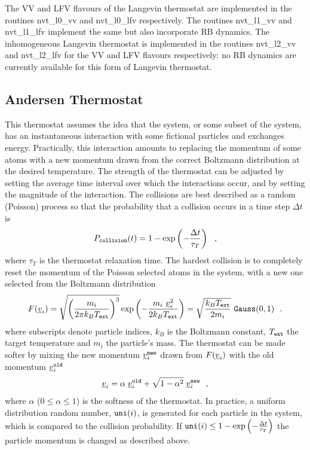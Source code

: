 The VV and LFV flavours of the Langevin thermostat are implemented in
the \D routines {\sc nvt\_l0\_vv} and {\sc nvt\_l0\_lfv} respectively.
The routines {\sc nvt\_l1\_vv} and {\sc nvt\_l1\_lfv} implement the
same but also incorporate RB dynamics. The inhomogeneous Langevin
thermostat is implemented in the \D routines {\sc nvt\_l2\_vv} and
{\sc nvt\_l2\_lfv} for the VV and LFV flavours respectively: no RB dynamics
are currently available for this form of Langevin thermostat.

\subsection{Andersen Thermostat}

This thermostat assumes the idea that the system, or some subset of
the system, has an instantaneous interaction with some fictional
particles and exchanges energy.  Practically, this interaction
amounts to replacing the momentum of some atoms with a new momentum
drawn from the correct Boltzmann distribution at the desired
temperature.  The strength of the thermostat can be adjusted by
setting the average time interval over which the interactions
occur, and by setting the magnitude of the interaction.  The
collisions are best described as a random (Poisson) process so that
the probability that a collision occurs
in a time step $\Delta t$ is
\begin{equation}
P_{\tt collision}(t) = 1 - \exp \left(-\frac{\Delta t}{\tau_{T}}\right)~~,
\end{equation}
where $\tau_{T}$ is the thermostat relaxation time.  The hardest
collision is to completely reset the momentum of the Poisson
selected atoms in the system, with a new one selected from the
Boltzmann distribution
\begin{equation}
F(\mbox{$\underline{v}$}_{i}) = \sqrt{\left(\frac{m_{i}}{2 \pi k_{B}T_{\tt ext}}\right)^{3}}
\exp \left(-\frac{m_{i}~\mbox{$\underline{v}$}_{i}^{2}}{2 k_{B}T_{\tt ext}}\right) =
\sqrt{\frac{k_{B}T_{\tt ext}}{2 m_{i}}}~{\tt Gauss}(0,1)~~.
\end{equation}
where subscripts denote particle indices, $k_{B}$ is the Boltzmann
constant, $T_{\tt ext}$ the target temperature and $m_{i}$ the particle's mass.
The thermostat can be made softer by mixing the new momentum
$\mbox{$\underline{v}$}_{i}^{\tt new}$ drawn from $F(\mbox{$\underline{v}$}_{i})$ with the old
momentum $\mbox{$\underline{v}$}_{i}^{\tt old}$
\begin{equation}
\mbox{$\underline{v}$}_{i} = \alpha \; \mbox{$\underline{v}$}_{i}^{\tt old} +
\sqrt{1-\alpha^{2}} \; \mbox{$\underline{v}$}_{i}^{\tt new}~~,
\end{equation}
where $\alpha$ ($0 \le \alpha \le 1$) is the softness of the
thermostat.  In practice, a uniform distribution random number,
${\tt uni}(i)$, is generated for each particle in the system,
which is compared to the collision probability.  If
${\tt uni}(i) \le 1 - \exp \left(-\frac{\Delta t}{\tau_{T}}\right)$
the particle momentum is changed as described above.

